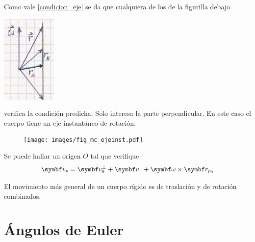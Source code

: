 \documentclass[10pt,oneside]{CBFT_book}
\begin{document}
Como vale \eqref{condicion_eje} se da que cualquiera de los  de la figurilla debajo

\includegraphics[scale=0.4]{images/fig_mc_rigid_body_ejerot2.jpg}

verifica la condición predicha. Solo interesa la parte perpendicular.
En este caso el cuerpo tiene un eje instantáneo de rotación.

\begin{figure}[htb]
	\begin{center}
	\texttt{[image: images/fig\_mc\_ejeinst.pdf]}	 
	\end{center}
	\caption{}
\end{figure} 

Se puede hallar un origen $O$ tal que verifique 
\[
	\vb{v}_p = \vb{v}_0^\perp + \vb{v}^\parallel + \vb{\omega} \times \vb{r}_{p_0}  
\]

El movimiento más general de un cuerpo rígido es de traslación y de rotación combinados.

\section{Ángulos de Euler}
\end{document}
